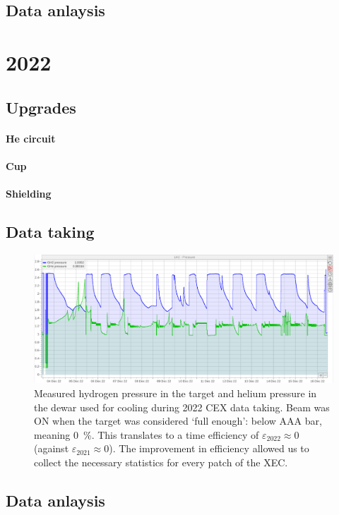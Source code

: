 \begin{refsection}
\subsection{Data anlaysis}

\section{2022}
\subsection{Upgrades}
\paragraph{He circuit}
\paragraph{Cup}
\paragraph{Shielding}
\subsection{Data taking}
\begin{figure}
    \centering
    \includegraphics[width = \textwidth]{Figures/LH2/2022CEX_LH2.png}
    \caption{Measured hydrogen pressure in the target and helium pressure in the dewar used for cooling during 2022 CEX data taking. 
    Beam was ON when the target was considered `full enough': below AAA bar, meaning \SI{0}{\%}.  
    This translates to a time efficiency of $\varepsilon_{2022}\approx0$ (against $\varepsilon_{2021}\approx0$). The improvement in efficiency allowed us to collect the necessary statistics for every patch of the XEC.}
    \label{fig:CEX2022}
\end{figure}
\subsection{Data anlaysis}


\end{refsection}
